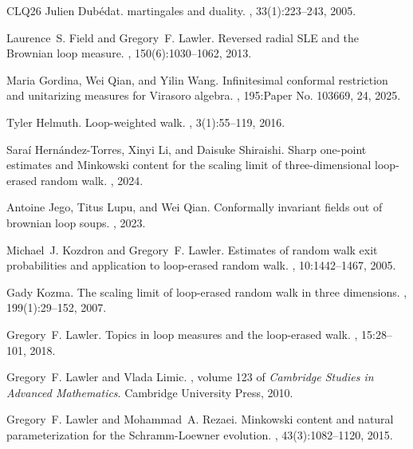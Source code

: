 \documentclass[11pt]{article}
\numberwithin{equation}{section}
\newcommand{\1}{\mathbf{1}}
\begin{document}
{\begin{thebibliography}{CLQ{\etalchar{+}}26}
Julien Dub\'{e}dat.
 martingales and duality.
, 33(1):223--243, 2005.

Laurence~S. Field and Gregory~F. Lawler.
\newblock Reversed radial {SLE} and the {B}rownian loop measure.
, 150(6):1030--1062, 2013.

Maria Gordina, Wei Qian, and Yilin Wang.
\newblock Infinitesimal conformal restriction and unitarizing measures for
  {V}irasoro algebra.
, 195:Paper No. 103669, 24, 2025.

Tyler Helmuth.
\newblock Loop-weighted walk.
, 3(1):55--119, 2016.

Sara{\'i} Hern{\'a}ndez-Torres, Xinyi Li, and Daisuke Shiraishi.
\newblock Sharp one-point estimates and {M}inkowski content for the scaling
  limit of three-dimensional loop-erased random walk.
, 2024.

Antoine Jego, Titus Lupu, and Wei Qian.
\newblock Conformally invariant fields out of brownian loop soups.
, 2023.

Michael~J. Kozdron and Gregory~F. Lawler.
\newblock Estimates of random walk exit probabilities and application to
  loop-erased random walk.
, 10:1442--1467, 2005.

Gady Kozma.
\newblock The scaling limit of loop-erased random walk in three dimensions.
, 199(1):29--152, 2007.

Gregory~F. Lawler.
\newblock Topics in loop measures and the loop-erased walk.
, 15:28--101, 2018.

Gregory~F. Lawler and Vlada Limic.
, volume 123 of {\em
  Cambridge Studies in Advanced Mathematics}.
\newblock Cambridge University Press, 2010.

Gregory~F. Lawler and Mohammad~A. Rezaei.
\newblock Minkowski content and natural parameterization for the
  {S}chramm-{L}oewner evolution.
, 43(3):1082--1120, 2015.


\end{thebibliography}}
\end{document}
